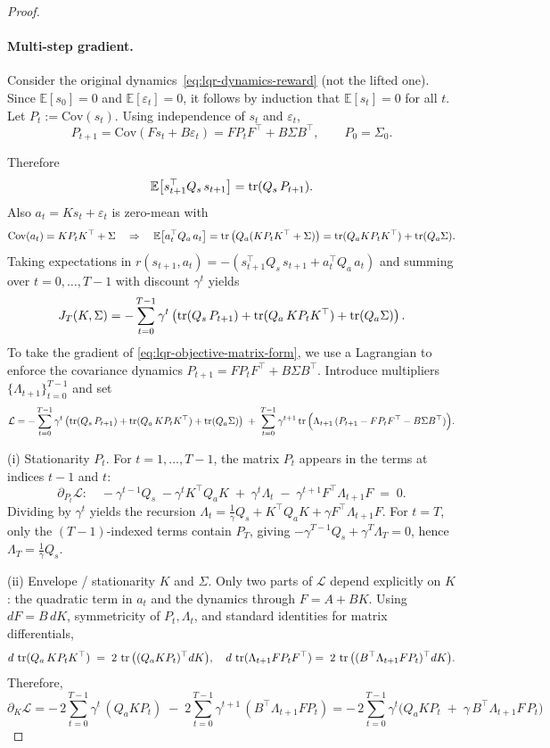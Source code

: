 \begin{proof}

\paragraph{Multi-step gradient.}
Consider the original dynamics~\eqref{eq:lqr-dynamics-reward} (not the lifted one). Since $\mathbb E[s_0]=0$ and $\mathbb E[\varepsilon_t]=0$, it follows by induction that $\mathbb E[s_t]=0$ for all $t$. Let $P_t:=\text{Cov}(s_t)$. Using independence of $s_t$ and $\varepsilon_t$,
\[
P_{t+1}=\text{Cov}(Fs_t+B\varepsilon_t)=F P_t F^\top + B\Sigma B^\top,\qquad P_0=\Sigma_0.
\]

Therefore
\[
\mathbb E\big[s_{t+1}^\top Q_s\, s_{t+1}\big]=\operatorname{tr}(Q_s\, P_{t+1}).
\]
Also $a_t=K s_t+\varepsilon_t$ is zero-mean with
\[
\text{Cov}(a_t)=K P_t K^\top + \Sigma
\quad\Rightarrow\quad
\mathbb E\big[a_t^\top Q_a\, a_t\big]=\operatorname{tr} \big(Q_a(K P_t K^\top+\Sigma)\big)
= \operatorname{tr}(Q_a K P_t K^\top)+\operatorname{tr}(Q_a\Sigma).
\]
Taking expectations in $r(s_{t+1},a_t)=-(s_{t+1}^\top Q_s\, s_{t+1}+a_t^\top Q_a\, a_t)$ and summing over $t=0,\dots,T-1$ with discount $\gamma^t$ yields
\begin{align}\label{eq:lqr-objective-matrix-form}
  J_T(K,\Sigma)
= -\sum_{t=0}^{T-1}\gamma^{t} \left(\operatorname{tr}(Q_s\,P_{t+1})
+\operatorname{tr}(Q_a\,K P_t K^\top)+\operatorname{tr}(Q_a\Sigma)\right).
\end{align}
To take the gradient of \eqref{eq:lqr-objective-matrix-form}, we use a Lagrangian to enforce the covariance dynamics $P_{t+1}=F P_t F^\top + B\Sigma B^\top$.
Introduce multipliers $\{\Lambda_{t+1}\}_{t=0}^{T-1}$ and set
\[
\mathcal L
= -\sum_{t=0}^{T-1}\gamma^{t} \left(\operatorname{tr}(Q_s\,P_{t+1})+\operatorname{tr}(Q_a\,K P_t K^\top)+\operatorname{tr}(Q_a\Sigma)\right)
\;+\;\sum_{t=0}^{T-1}\gamma^{t+1}\operatorname{tr} \Big(\Lambda_{t+1}\,(P_{t+1}-F P_t F^\top - B\Sigma B^\top)\Big).
\]

(i) Stationarity \wrt  $P_t$.
For $t=1,\dots,T-1$, the matrix $P_t$ appears in the terms at indices $t-1$ and $t$:
\[
\partial_{P_t}\mathcal L:\quad
-\gamma^{t-1}Q_s\;-\gamma^{t}K^\top Q_a K \;+\;\gamma^{t}\Lambda_t\;-\;\gamma^{t+1}F^\top \Lambda_{t+1}F \;=\;0.
\]
Dividing by $\gamma^{t}$ yields the recursion
$\Lambda_t=\tfrac{1}{\gamma}Q_s+K^\top Q_a K+\gamma F^\top\Lambda_{t+1}F$.
For $t=T$, only the $(T-1)$-indexed terms contain $P_T$, giving
$-\gamma^{T-1}Q_s+\gamma^{T}\Lambda_T=0$, hence $\Lambda_T=\tfrac{1}{\gamma}Q_s$.

(ii) Envelope / stationarity \wrt  $K$ and $\Sigma$.
Only two parts of $\mathcal L$ depend explicitly on $K$:
the quadratic term in $a_t$ and the dynamics through $F=A+BK$.
Using $dF=B\,dK$, symmetricity of $P_t, \Lambda_t$, and standard identities for matrix differentials,
\[
d\,\operatorname{tr}(Q_a\,K P_t K^\top) \;=\; 2\,\operatorname{tr} \big((Q_a K P_t)^\top dK\big),
\quad
d\,\operatorname{tr}(\Lambda_{t+1} F P_t F^\top)
=\;2\,\operatorname{tr} \big((B^\top\Lambda_{t+1}F P_t)^\top dK\big).
\]
Therefore,
\[
\partial_K\mathcal L
= -\,2\sum_{t=0}^{T-1}\gamma^t\,(Q_a K P_t)
\;-\;2\sum_{t=0}^{T-1}\gamma^{t+1}\,(B^\top\Lambda_{t+1}F P_t)
= -\,2\sum_{t=0}^{T-1}\gamma^{t}\Big( Q_a K P_t \;+\; \gamma\, B^\top \Lambda_{t+1} F\, P_t \Big)
\]


\end{proof}
